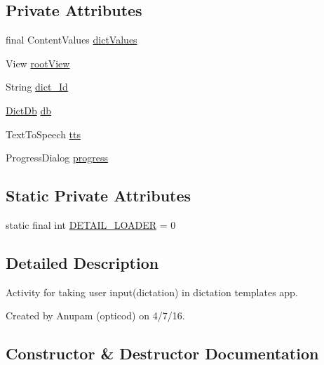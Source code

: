 \subsection*{Private Attributes}
\begin{DoxyCompactItemize}
\item 
final Content\+Values \hyperlink{classorg_1_1buildmlearn_1_1dictation_1_1fragment_1_1DetailActivityFragment_a2820f845cf4a931d99af820fa1f6bbe3}{dict\+Values}
\item 
View \hyperlink{classorg_1_1buildmlearn_1_1dictation_1_1fragment_1_1DetailActivityFragment_a43c90b2bd0e909925b5adf1051787937}{root\+View}
\item 
String \hyperlink{classorg_1_1buildmlearn_1_1dictation_1_1fragment_1_1DetailActivityFragment_aaf4edb308fe77b70cadef8d4e512a0e1}{dict\+\_\+\+Id}
\item 
\hyperlink{classorg_1_1buildmlearn_1_1dictation_1_1data_1_1DictDb}{Dict\+Db} \hyperlink{classorg_1_1buildmlearn_1_1dictation_1_1fragment_1_1DetailActivityFragment_aa64efd98ebdaad0b9c76724ba3c0c9c9}{db}
\item 
Text\+To\+Speech \hyperlink{classorg_1_1buildmlearn_1_1dictation_1_1fragment_1_1DetailActivityFragment_a6506b1e77243b1a0dbe82a884aa2c9b7}{tts}
\item 
Progress\+Dialog \hyperlink{classorg_1_1buildmlearn_1_1dictation_1_1fragment_1_1DetailActivityFragment_a0ab2031f1952c6556af67f28388b4f99}{progress}
\end{DoxyCompactItemize}
\subsection*{Static Private Attributes}
\begin{DoxyCompactItemize}
\item 
static final int \hyperlink{classorg_1_1buildmlearn_1_1dictation_1_1fragment_1_1DetailActivityFragment_a3b8c97260dc4959fc14e2bf3d4db738d}{D\+E\+T\+A\+I\+L\+\_\+\+L\+O\+A\+D\+ER} = 0
\end{DoxyCompactItemize}


\subsection{Detailed Description}
Activity for taking user input(dictation) in dictation template\textquotesingle{}s app. 

Created by Anupam (opticod) on 4/7/16. 

\subsection{Constructor \& Destructor Documentation}
